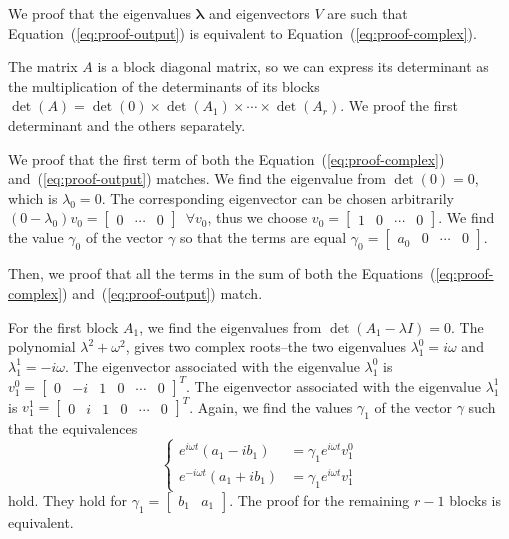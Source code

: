 \documentclass[letterpaper,10pt,conference]{ieeeconf}
\theoremstyle{definition}
\begin{document}
We proof that the eigenvalues $\mathbf{\lambda}$ and eigenvectors $V$ are such that Equation~(\ref{eq:proof-output}) is equivalent to Equation~(\ref{eq:proof-complex}).

The matrix $A$ is a block diagonal matrix, so we can express its determinant as the multiplication of the determinants of its blocks $\det{(A)}=\det{(0)}\times\det{(A_1)}\times\cdots\times\det{(A_r)}$. We proof the first determinant and the others separately.

We proof that the first term of both the Equation~(\ref{eq:proof-complex}) and~(\ref{eq:proof-output}) matches. We find the eigenvalue from $\det(0)=0$, which is $\lambda_0=0$. The corresponding eigenvector can be chosen arbitrarily $(0-\lambda_0)v_0=\begin{bmatrix} 0 & \cdots & 0 \end{bmatrix}\,\,\,\forall v_0$, thus we choose $v_0=\begin{bmatrix}1 & 0 & \cdots & 0\end{bmatrix}$. We find the value $\gamma_0$ of the vector $\gamma$ so that the terms are equal $\gamma_0=\begin{bmatrix}a_0 & 0 & \cdots & 0\end{bmatrix}$. 

Then, we proof that all the terms in the sum of both the Equations~(\ref{eq:proof-complex}) and~(\ref{eq:proof-output}) match. 

For the first block $A_1$, we find the eigenvalues from $\det(A_1-\lambda I)=0$. The polynomial $\lambda^2+\omega^2$, gives two complex roots--the two eigenvalues $\lambda_1^0=i\omega$ and $\lambda_1^1=-i\omega$. The eigenvector associated with the eigenvalue $\lambda_1^0$ is $v_1^0=\begin{bmatrix}0 & -i&1&0&\cdots&0\end{bmatrix}^T$. The eigenvector associated with the eigenvalue $\lambda_1^1$ is $v_1^1=\begin{bmatrix}0&i&1&0&\cdots&0\end{bmatrix}^T$. Again, we find the values $\gamma_1$ of the vector $\gamma$ such that the equivalences 
\begin{equation*}\begin{cases}
  e^{i\omega t}(a_1-ib_1)&=\gamma_1 e^{i\omega t}v_1^0\\
  e^{-i\omega t}(a_1+ib_1)&=\gamma_1 e^{i\omega t}v_1^1
\end{cases}\end{equation*}
hold. They hold for $\gamma_1=\begin{bmatrix}b_1&a_1\end{bmatrix}$. The proof for the remaining $r-1$ blocks is equivalent.
\end{document}
